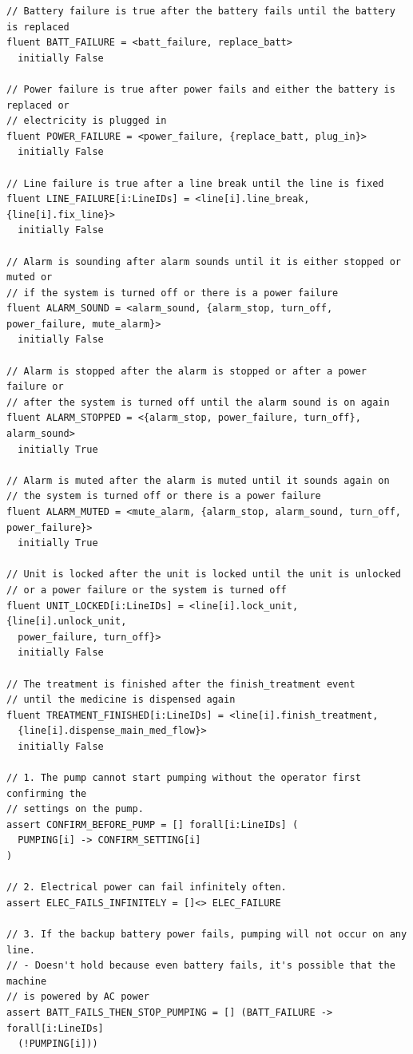 \documentclass[titlepage]{article}
\begin{document}
\begin{verbatim}
// Battery failure is true after the battery fails until the battery is replaced
fluent BATT_FAILURE = <batt_failure, replace_batt>
  initially False

// Power failure is true after power fails and either the battery is replaced or
// electricity is plugged in
fluent POWER_FAILURE = <power_failure, {replace_batt, plug_in}>
  initially False

// Line failure is true after a line break until the line is fixed
fluent LINE_FAILURE[i:LineIDs] = <line[i].line_break, {line[i].fix_line}>
  initially False

// Alarm is sounding after alarm sounds until it is either stopped or muted or
// if the system is turned off or there is a power failure
fluent ALARM_SOUND = <alarm_sound, {alarm_stop, turn_off, power_failure, mute_alarm}>
  initially False

// Alarm is stopped after the alarm is stopped or after a power failure or 
// after the system is turned off until the alarm sound is on again
fluent ALARM_STOPPED = <{alarm_stop, power_failure, turn_off}, alarm_sound>
  initially True

// Alarm is muted after the alarm is muted until it sounds again on 
// the system is turned off or there is a power failure
fluent ALARM_MUTED = <mute_alarm, {alarm_stop, alarm_sound, turn_off, power_failure}>
  initially True

// Unit is locked after the unit is locked until the unit is unlocked
// or a power failure or the system is turned off
fluent UNIT_LOCKED[i:LineIDs] = <line[i].lock_unit, {line[i].unlock_unit,
  power_failure, turn_off}>
  initially False

// The treatment is finished after the finish_treatment event 
// until the medicine is dispensed again
fluent TREATMENT_FINISHED[i:LineIDs] = <line[i].finish_treatment,
  {line[i].dispense_main_med_flow}>
  initially False

// 1. The pump cannot start pumping without the operator first confirming the
// settings on the pump.
assert CONFIRM_BEFORE_PUMP = [] forall[i:LineIDs] (
  PUMPING[i] -> CONFIRM_SETTING[i]
)

// 2. Electrical power can fail infinitely often.
assert ELEC_FAILS_INFINITELY = []<> ELEC_FAILURE

// 3. If the backup battery power fails, pumping will not occur on any line.
// - Doesn't hold because even battery fails, it's possible that the machine
// is powered by AC power
assert BATT_FAILS_THEN_STOP_PUMPING = [] (BATT_FAILURE -> forall[i:LineIDs]
  (!PUMPING[i]))


\end{verbatim}
\end{document}
